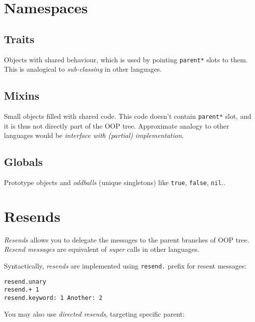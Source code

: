 \documentclass[10pt]{article}
\begin{document}
\begin{multicols*}{3}
\pagebreak %
\section{Namespaces}

\subsection{Traits}
Objects with shared behaviour, which is used by pointing \texttt{parent*} slots to them. This is analogical to \textit{sub-classing} in other languages.



\subsection{Mixins}

Small objects filled with shared code. This code doesn't contain \texttt{parent*} slot, and it is thus not directly part of the OOP tree. Approximate analogy to other languages would be \textit{interface with (partial) implementation}.



\subsection{Globals}
Prototype objects and \textit{oddballs} (unique singletons) like \texttt{true}, \texttt{false}, \texttt{nil}..




\section{Resends}

\textit{Resends} allows you to delegate the messages to the parent branches of OOP tree. \textit{Resend messages} are equivalent of \textit{super} calls in other languages.

Syntactically, \textit{resends} are implemented using \texttt{resend.} prefix for resent messages:

\begin{lstlisting}
resend.unary
resend.+ 1
resend.keyword: 1 Another: 2
\end{lstlisting}

You may also use \textit{directed resends}, targeting specific parent:


\end{multicols*}
\end{document}
